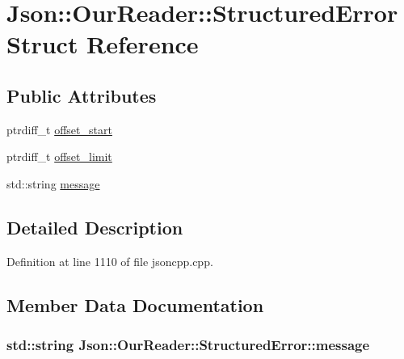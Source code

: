 \hypertarget{struct_json_1_1_our_reader_1_1_structured_error}{}\section{Json\+:\+:Our\+Reader\+:\+:Structured\+Error Struct Reference}
\label{struct_json_1_1_our_reader_1_1_structured_error}
\subsection*{Public Attributes}
\begin{DoxyCompactItemize}
\item 
ptrdiff\+\_\+t \hyperlink{struct_json_1_1_our_reader_1_1_structured_error_a102677698afb8177c985e72dafe72b15}{offset\+\_\+start}
\item 
ptrdiff\+\_\+t \hyperlink{struct_json_1_1_our_reader_1_1_structured_error_a15491a751a39c5153af04e68b1d0abb9}{offset\+\_\+limit}
\item 
std\+::string \hyperlink{struct_json_1_1_our_reader_1_1_structured_error_adc8a757b6452cc6ab14fb90b933b3414}{message}
\end{DoxyCompactItemize}


\subsection{Detailed Description}


Definition at line 1110 of file jsoncpp.\+cpp.



\subsection{Member Data Documentation}
\subsubsection[{\texorpdfstring{message}{message}}]{\setlength{\rightskip}{0pt plus 5cm}std\+::string Json\+::\+Our\+Reader\+::\+Structured\+Error\+::message}\hypertarget{struct_json_1_1_our_reader_1_1_structured_error_adc8a757b6452cc6ab14fb90b933b3414}{}\label{struct_json_1_1_our_reader_1_1_structured_error_adc8a757b6452cc6ab14fb90b933b3414}


